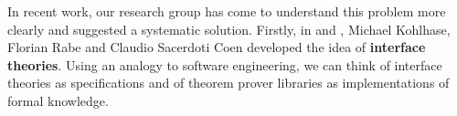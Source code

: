 %
%

In recent work, our research group has come to understand this problem more clearly and suggested a systematic solution.
Firstly, in \cite{KohRabSac:fvip11} and \cite{KohRab:qrtpflmk15}, Michael Kohlhase, Florian Rabe and Claudio Sacerdoti Coen developed the idea of \textbf{interface theories}.
Using an analogy to software engineering, we can think of interface theories as specifications and of theorem prover libraries as implementations of formal knowledge.


